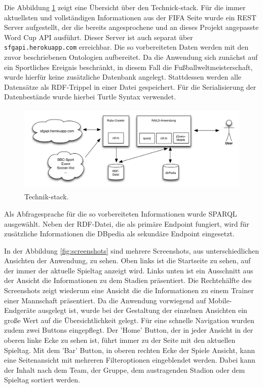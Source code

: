 \documentclass[runningheads,a4paper]{llncs}
\begin{document}
Die Abbildung \ref{fig:example} zeigt eine Übersicht über den Technick-stack. Für die immer aktuellsten und vollständigen Informationen aus der FIFA Seite wurde ein REST Server aufgestellt, der die bereits angesprochene und an dieses Projekt angepasste Word Cup API ausführt. Dieser Server ist auch separat über \texttt{sfgapi.herokuapp.com} erreichbar. Die so vorbereiteten Daten werden mit den zuvor beschriebenen Ontologien aufbereitet. Da die Anwendung sich zunächst auf ein Sportliches Ereignis beschränkt, in diesem Fall die Fußballweltmeisterschaft, wurde hierfür keine zusätzliche Datenbank angelegt. Stattdessen werden alle Datensätze als RDF-Trippel in einer Datei gespeichert. Für die Serialisierung der Datenbestände wurde hierbei Turtle Syntax verwendet.
\begin{figure}
\centering
\includegraphics[height=4.2cm]{technik-stack}
\caption{Technik-stack.}
\label{fig:example}
\end{figure}


Als Abfragesprache für die so vorbereiteten Informationen wurde SPARQL ausgewählt. Neben der RDF-Datei, die als primäre Endpoint fungiert, wird für zusätzliche Informationen die DBpedia als sekundäre Endpoint eingesetzt. 

\newpage
In der Abbildung \ref{fig:screenshots} sind mehrere Screenshots, aus unterschiedlichen Ansichten der Anwendung, zu sehen. Oben links ist die Startseite zu sehen, auf der immer der aktuelle Spieltag anzeigt wird. Links unten ist ein Ausschnitt aus der Ansicht die Informationen zu dem Stadien präsentiert. Die Rechtehälfte des Screenshots zeigt wiederum eine Ansicht die die Informationen zu einem Trainer einer Mannschaft präsentiert. Da die Anwendung vorwiegend auf Mobile-Endgeräte ausgelegt ist, wurde bei der Gestaltung der einzelnen Ansichten ein große Wert auf die Übersichtlichkeit gelegt. Für eine schnelle Navigation wurden zudem zwei Buttons eingepflegt. Der 'Home' Button, der in jeder Ansicht in der oberen linke Ecke zu sehen ist, führt immer zu der Seite mit den aktuellen Spieltag. Mit dem 'Bar' Button, in oberen rechten Ecke der Spiele Ansicht, kann eine Seitenansicht mit mehreren Filteroptionen eingeblendet werden. Dabei kann der Inhalt nach dem Team, der Gruppe, dem austragenden Stadion oder dem Spieltag sortiert werden.
\end{document}
